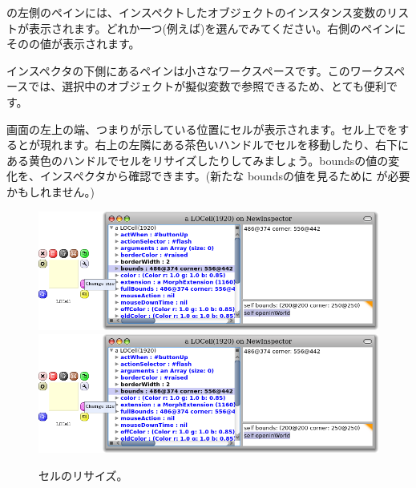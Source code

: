 \documentclass[a4paper,10pt,twoside]{book}
\begin{document}
の左側のペインには、インスペクトしたオブジェクトのインスタンス変数のリストが表示されます。どれか一つ(例えば\mbox{})を選んでみてください。右側のペインにそのの値が表示されます。


インスペクタの下側にあるペインは小さなワークスペースです。このワークスペースでは、選択中のオブジェクトが擬似変数\self で参照できるため、とても便利です。


画面の左上の端、つまりが示している位置にセルが表示されます。セル上で\metaclick をするとが現れます。右上の左隣にある茶色いハンドルでセルを移動したり、右下にある黄色のハンドルでセルをリサイズしたりしてみましょう。boundsの値の変化を、インスペクタから確認できます。(新たな boundsの値を見るために  \actclick が必要かもしれません。)

\begin{figure}[htbp]
\centering
\ifluluelse
	{\includegraphics[width=\textwidth]{LOCellResize} }
	{\includegraphics[scale=0.7]{LOCellResize} }
\caption{セルのリサイズ。}
\end{figure}
\end{document}

